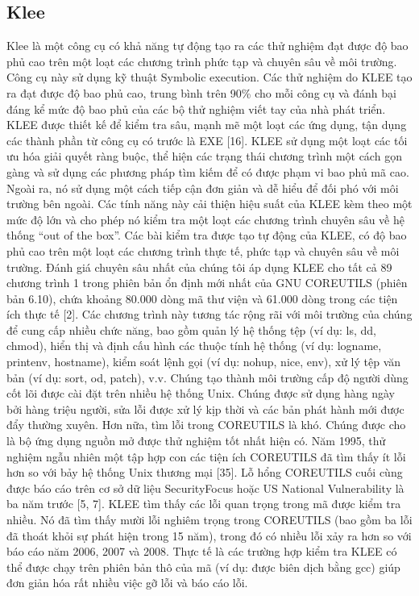 \documentclass[12pt,a4paper]{article}
\begin{document}
\subsection{Klee}
Klee là một công cụ có khả năng tự động tạo ra các thử nghiệm đạt được độ bao phủ cao trên một loạt các chương trình phức tạp và chuyên sâu về môi trường. Công cụ này sử dụng kỹ thuật Symbolic execution. Các thử nghiệm do KLEE tạo ra đạt được độ bao phủ cao, trung bình trên 90\% cho mỗi công cụ và đánh bại đáng kể mức độ bao phủ của các bộ thử nghiệm viết tay của nhà phát triển.\newline
\indent KLEE được thiết kế để kiểm tra sâu, mạnh mẽ một loạt các ứng dụng, tận dụng các thành phần từ công cụ có trước là EXE [16]. KLEE sử dụng một loạt các tối ưu hóa giải quyết ràng buộc, thể hiện các trạng thái chương trình một cách gọn gàng và sử dụng các phương pháp tìm kiếm để có được phạm vi bao phủ mã cao. Ngoài ra, nó sử dụng một cách tiếp cận đơn giản và dễ hiểu để đối phó với môi trường bên ngoài. Các tính năng này cải thiện hiệu suất của KLEE kèm theo một mức độ lớn và cho phép nó kiểm tra một loạt các chương trình chuyên sâu về hệ thống “out of the box”.\newline
\indent Các bài kiểm tra được tạo tự động của KLEE, có độ bao phủ cao trên một loạt các chương trình thực tế, phức tạp và chuyên sâu về môi trường. Đánh giá chuyên sâu nhất của chúng tôi áp dụng KLEE cho tất cả 89 chương trình 1 trong phiên bản ổn định mới nhất của GNU COREUTILS (phiên bản 6.10), chứa khoảng 80.000 dòng mã thư viện và 61.000 dòng trong các tiện ích thực tế [2]. Các chương trình này tương tác rộng rãi với môi trường của chúng để cung cấp nhiều chức năng, bao gồm quản lý hệ thống tệp (ví dụ: ls, dd, chmod), hiển thị và định cấu hình các thuộc tính hệ thống (ví dụ: logname, printenv, hostname), kiểm soát lệnh gọi (ví dụ: nohup, nice, env), xử lý tệp văn bản (ví dụ: sort, od, patch), v.v. Chúng tạo thành môi trường cấp độ người dùng cốt lõi được cài đặt trên nhiều hệ thống Unix. Chúng được sử dụng hàng ngày bởi hàng triệu người, sửa lỗi được xử lý kịp thời và các bản phát hành mới được đẩy thường xuyên. Hơn nữa, tìm lỗi trong COREUTILS là khó. Chúng được cho là bộ ứng dụng nguồn mở được thử nghiệm tốt nhất hiện có. Năm 1995, thử nghiệm ngẫu nhiên một tập hợp con các tiện ích COREUTILS đã tìm thấy ít lỗi hơn so với bảy hệ thống Unix thương mại [35]. Lỗ hổng COREUTILS cuối cùng được báo cáo trên cơ sở dữ liệu SecurityFocus hoặc US National Vulnerability là ba năm trước [5, 7].\newline
\indent KLEE tìm thấy các lỗi quan trọng trong mã được kiểm tra nhiều. Nó đã tìm thấy mười lỗi nghiêm trọng trong COREUTILS (bao gồm ba lỗi đã thoát khỏi sự phát hiện trong 15 năm), trong đó có nhiều lỗi xảy ra hơn so với báo cáo năm 2006, 2007 và 2008. Thực tế là các trường hợp kiểm tra KLEE có thể được chạy trên phiên bản thô của mã (ví dụ: được biên dịch bằng gcc) giúp đơn giản hóa rất nhiều việc gỡ lỗi và báo cáo lỗi.\newline
\end{document}
